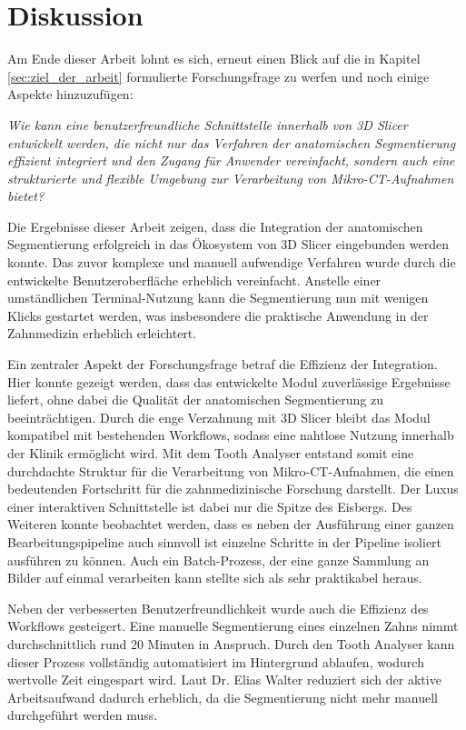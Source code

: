 \chapter{Diskussion}
\label{chap:diskussion} Am Ende dieser Arbeit lohnt es sich, erneut einen Blick
auf die in Kapitel \ref{sec:ziel_der_arbeit} formulierte Forschungsfrage zu
werfen und noch einige Aspekte hinzuzufügen:

\textit{Wie kann eine benutzerfreundliche Schnittstelle innerhalb von 3D Slicer
entwickelt werden, die nicht nur das Verfahren der anatomischen Segmentierung effizient
integriert und den Zugang für Anwender vereinfacht, sondern auch eine
strukturierte und flexible Umgebung zur Verarbeitung von Mikro-\ac{CT}-Aufnahmen
bietet?}

Die Ergebnisse dieser Arbeit zeigen, dass die Integration der anatomischen Segmentierung
erfolgreich in das Ökosystem von 3D Slicer eingebunden werden konnte. Das zuvor
komplexe und manuell aufwendige Verfahren wurde durch die entwickelte
Benutzeroberfläche erheblich vereinfacht. Anstelle einer umständlichen Terminal-Nutzung
kann die Segmentierung nun mit wenigen Klicks gestartet werden, was insbesondere
die praktische Anwendung in der Zahnmedizin erheblich erleichtert.

Ein zentraler Aspekt der Forschungsfrage betraf die Effizienz der Integration. Hier
konnte gezeigt werden, dass das entwickelte Modul zuverlässige Ergebnisse
liefert, ohne dabei die Qualität der anatomischen Segmentierung zu beeinträchtigen.
Durch die enge Verzahnung mit 3D Slicer bleibt das Modul kompatibel mit
bestehenden Workflows, sodass eine nahtlose Nutzung innerhalb der Klinik ermöglicht
wird. Mit dem Tooth Analyser entstand somit eine durchdachte Struktur für die
Verarbeitung von Mikro-\ac{CT}-Aufnahmen, die einen bedeutenden Fortschritt für die zahnmedizinische
Forschung darstellt. Der Luxus einer interaktiven Schnittstelle ist dabei nur
die Spitze des Eisbergs. Des Weiteren konnte beobachtet werden, dass es neben
der Ausführung einer ganzen Bearbeitungspipeline auch sinnvoll ist einzelne
Schritte in der Pipeline isoliert ausführen zu können. Auch ein Batch-Prozess,
der eine ganze Sammlung an Bilder auf einmal verarbeiten kann stellte sich als
sehr praktikabel heraus.

Neben der verbesserten Benutzerfreundlichkeit wurde auch die Effizienz des
Workflows gesteigert. Eine manuelle Segmentierung eines einzelnen Zahns nimmt durchschnittlich
rund 20 Minuten in Anspruch. Durch den Tooth Analyser kann dieser Prozess
vollständig automatisiert im Hintergrund ablaufen, wodurch wertvolle Zeit eingespart
wird. Laut Dr. Elias Walter reduziert sich der aktive Arbeitsaufwand dadurch erheblich,
da die Segmentierung nicht mehr manuell durchgeführt werden muss.

